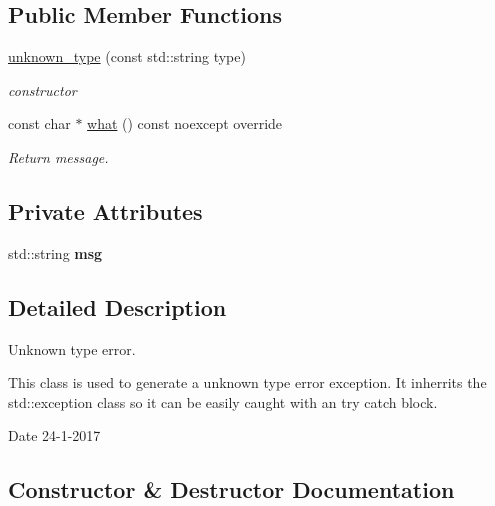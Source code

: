 \subsection*{Public Member Functions}
\begin{DoxyCompactItemize}
\item 
\hyperlink{classunknown__type_ad0900df174fd2897ea46896d46d4ce47}{unknown\+\_\+type} (const std\+::string type)
\begin{DoxyCompactList}\small\item\em constructor \end{DoxyCompactList}\item 
const char $\ast$ \hyperlink{classunknown__type_a95f8c551c7bf001353d4a68b6874650d}{what} () const noexcept override
\begin{DoxyCompactList}\small\item\em Return message. \end{DoxyCompactList}\end{DoxyCompactItemize}
\subsection*{Private Attributes}
\begin{DoxyCompactItemize}
\item 
\mbox{\label{classunknown__type_a3a4241b982eb18fdfea370f5565b1c3f}} 
std\+::string {\bfseries msg}
\end{DoxyCompactItemize}


\subsection{Detailed Description}
Unknown type error. 

This class is used to generate a unknown type error exception. It inherrits the std\+::exception class so it can be easily caught with an try catch block.

\begin{DoxyDate}{Date}
24-\/1-\/2017 
\end{DoxyDate}


\subsection{Constructor \& Destructor Documentation}
\mbox{\label{classunknown__type_ad0900df174fd2897ea46896d46d4ce47}} 
